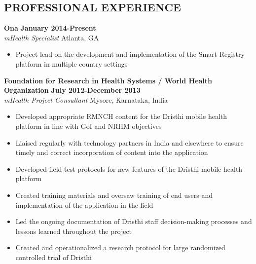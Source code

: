 \documentclass{res}
\begin{document}
\thispagestyle{empty} %

\address{ 5405 Hedge Creek Ln NW \\   Acworth, GA 30101 \\ +1 724 255 8968}      
                                      
\address{cgulas@ona.io}

\begin{resume}
 
\section{PROFESSIONAL EXPERIENCE} 

\vspace{8pt}
\textbf{Ona} \hfill        \textbf{January 2014-Present} \\
\emph{mHealth Specialist}       \hfill   Atlanta, GA

\begin{itemize} \itemsep -2pt %
	\item Project lead on the development and implementation of the Smart Registry platform in multiple country settings

 \end{itemize} \vspace{-4pt}

\vspace{8pt}
\textbf{Foundation for Research in Health Systems / World Health Organization} \hfill        \textbf{July 2012-December 2013} \\
\emph{mHealth Project Consultant}       \hfill   Mysore, Karnataka, India

\begin{itemize} \itemsep -2pt %
	\item Developed appropriate RMNCH content for the Dristhi mobile health platform in line with GoI and NRHM objectives
	\item Liaised regularly with technology partners in India and elsewhere to ensure timely and correct incorporation of content into the application
    \item Developed field test protocols for new features of the Dristhi mobile health platform
	\item Created training materials and oversaw training of end users and implementation of the application in the field
	\item Led the ongoing documentation of Dristhi staff decision-making processes and lessons learned throughout the project
	\item Created and operationalized a research protocol for large randomized controlled trial of Dristhi
 \end{itemize} \vspace{-4pt}


\end{resume}
\end{document}
